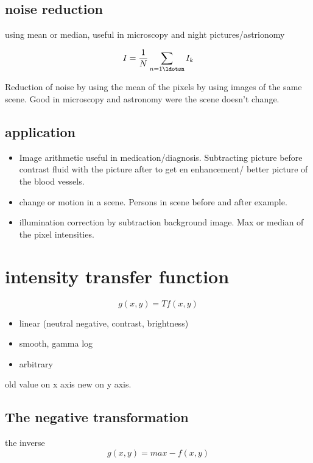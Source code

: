 \documentclass[a4paper]{article}
\begin{document}
\subsection{noise reduction}
using mean or median, useful in microscopy and night pictures/astrionomy

\begin{equation}
I = \frac{1} {N} \sum_{n=1 \ldotsn }I_k
\end{equation}

Reduction of noise by using the mean of the pixels by using images of the same scene. Good in microscopy and astronomy were the scene doesn't change. 

\subsection{application}

\begin{itemize}
    \item Image arithmetic useful in medication/diagnosis. Subtracting picture before contrast fluid with the picture after to get en enhancement/ better picture of the blood vessels. 
    \item change or motion in a scene. Persons in scene before and after example. 
    \item illumination correction by subtraction background image. Max or median of the pixel intensities. 
\end{itemize}


\section{intensity transfer function}

\begin{equation}
g(x,y) = Tf(x,y)
\end{equation}

\begin{itemize}
    \item linear (neutral negative, contrast, brightness)
    \item smooth, gamma log
    \item arbitrary
\end{itemize}

old value on x axis new on y axis.

\subsection{The negative transformation}
the inverse 
\begin{equation}
g(x,y) = max - f(x,y)
\end{equation}
\end{document}
